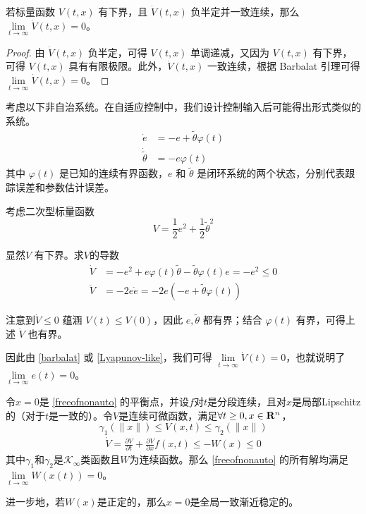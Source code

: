 \begin{theorem}\label{Lyapunov-like}
  若标量函数 $V(t, x)$ 有下界，且 $\dot{V}(t, x)$ 负半定并一致连续，那么 $\lim\limits_{t \to \infty} \dot{V}(t, x) = 0$。
\end{theorem}
\begin{proof}
  由 $\dot{V}(t, x)$ 负半定，可得 $V (t, x)$ 单调递减，又因为 $V(t, x)$ 有下界，可得 $V (t, x)$ 具有有限极限。此外，$\dot{V}(t, x)$ 一致连续，根据 Barbalat 引理可得 $\lim\limits_{t \to \infty} \dot{V}(t, x) = 0$。
\end{proof}
\begin{example}
  考虑以下非自治系统。在自适应控制中，我们设计控制输入后可能得出形式类似的系统。
  \begin{align*}
    \dot{e} & = - e + \tilde{\theta} \varphi (t)\\
    \dot{\tilde{\theta}} & = - e \varphi (t)
  \end{align*}
  其中 $\varphi (t)$ 是已知的连续有界函数，$e$ 和 $\tilde{\theta}$ 是闭环系统的两个状态，分别代表跟踪误差和参数估计误差。
  
  考虑二次型标量函数 \[V = \frac{1}{2} e^2 + \frac{1}{2} \tilde{\theta}^2\]
  
  显然$V$ 有下界。求$V$的导数
  \begin{align*}
    \dot{V} &= - e^2+e\varphi(t)\tilde{\theta}-\tilde{\theta}\varphi(t)e= - e^2 \leq 0 \\
    \ddot{V} &= - 2 e  \dot{e} = - 2 e (- e + \tilde{\theta} \varphi (t))
  \end{align*}
  
  注意到$\dot{V} \leq 0$ 蕴涵 $V (t) \leq V (0)$，因此 $e, \tilde{\theta}$ 都有界；结合  
   $\varphi (t)$ 有界，可得上述 $\ddot{V}$ 也有界。
  
  因此由 \ref{barbalat} 或 \ref{Lyapunov-like}，我们可得 $\lim\limits_{t \rightarrow\infty} \dot{V} (t) = 0$，也就说明了 $\lim\limits_{t \rightarrow \infty} e (t) = 0$。
\end{example}
\begin{theorem}\label{LaSalle-Yoshizawa}
    令$x=0$是 \eqref{freeofnonauto} 的平衡点，并设$f$对$t$是分段连续，且对$x$是局部Lipschitz的（对于$t$是一致的）。令$V$是连续可微函数，满足$\forall t\ge 0,x\in\mathbf{R}{}^n$，\[\gamma_1(\|x\|)\le V(x,t)\le \gamma_2(\|x\|)\]
    \[\begin{aligned}\dot{V}=\frac{\partial V}{\partial t}+\frac{\partial V}{\partial x}f(x,t)\leq-W(x)\leq0\end{aligned}\]
    其中$\gamma_1$和$\gamma_2$是$\mathcal{K}_\infty$类函数且$W$为连续函数。那么  \eqref{freeofnonauto} 的所有解均满足$\lim\limits_{t\to\infty}W(x(t))=0$。
    
    进一步地，若$W(x)$是正定的，那么$x=0$是全局一致渐近稳定的。
\end{theorem}
